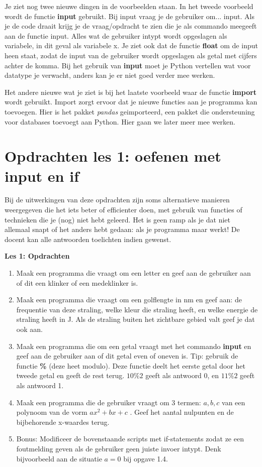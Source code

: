 



Je ziet nog twee nieuwe dingen in de voorbeelden staan. In het tweede voorbeeld wordt de functie \textbf{input} gebruikt. Bij input vraag je de gebruiker om... input. Als je de code draait krijg je de vraag/opdracht te zien die je als commando meegeeft aan de functie input. Alles wat de gebruiker intypt wordt opgeslagen als variabele, in dit geval als variabele x. Je ziet ook dat de functie \textbf{float} om de input heen staat, zodat de input van de gebruiker wordt opgeslagen als getal met cijfers achter de komma. Bij het gebruik van \textbf{input} moet je Python vertellen wat voor datatype je verwacht, anders kan je er niet goed verder mee werken. 

Het andere nieuwe wat je ziet is bij het laatste voorbeeld waar de functie \textbf{import} wordt gebruikt. Import zorgt ervoor dat je nieuwe functies aan je programma kan toevoegen. Hier is het pakket \textit{pandas} geimporteerd, een pakket die ondersteuning voor databases toevoegt aan Python. Hier gaan we later meer mee werken. 

\section{Opdrachten les 1: oefenen met input en if}
Bij de uitwerkingen van deze opdrachten zijn soms alternatieve manieren weergegeven die het iets beter of efficienter doen, met gebruik van functies of technieken die je (nog) niet hebt geleerd. Het is geen ramp als je dat niet allemaal snapt of het anders hebt gedaan: als je programma maar werkt! De docent kan alle antwoorden toelichten indien gewenst. 

\textbf{Les 1: Opdrachten}
\begin{enumerate}[label=\textbf{1.\arabic*}]
\item Maak een programma die vraagt om een letter en geef aan de gebruiker aan of dit een klinker of een medeklinker is. 
\item Maak een programma die vraagt om een golflengte in nm en geef aan: de frequentie van deze straling, welke kleur die straling heeft, en welke energie de straling heeft in J. Als de straling buiten het zichtbare gebied valt geef je dat ook aan. 
\item Maak een programma die om een getal vraagt met het commando \textbf{input} en geef aan de gebruiker aan of dit getal even of oneven is. Tip: gebruik de functie \textbf{\%} (deze heet modulo). Deze functie deelt het eerste getal door het tweede getal en geeft de rest terug. $10 \% 2$ geeft als antwoord 0, en $11 \% 2$ geeft als antwoord 1. 
\item Maak een programma die de gebruiker vraagt om 3 termen: $a, b, c$ van een polynoom van de vorm $ax^2 + bx + c$ . Geef het aantal nulpunten en de bijbehorende x-waardes terug.
\item Bonus: Modificeer de bovenstaande scripts met if-statements zodat ze een foutmelding geven als de gebruiker geen juiste invoer intypt. Denk bijvoorbeeld aan de situatie $a=0$ bij opgave 1.4. 
\end{enumerate}
